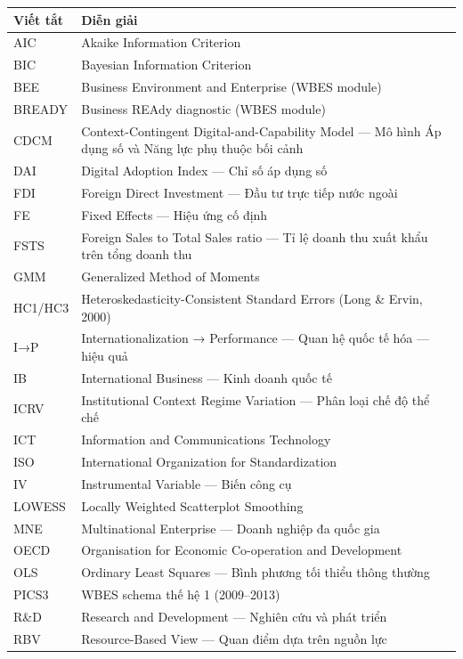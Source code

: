 \documentclass[12pt,a4paper]{article}
\begin{document}
\begin{longtable}[]{@{}ll@{}}
\toprule\noalign{}
Viết tắt & Diễn giải \\
\midrule\noalign{}
\endhead
\bottomrule\noalign{}
\endlastfoot
AIC & Akaike Information Criterion \\
BIC & Bayesian Information Criterion \\
BEE & Business Environment and Enterprise (WBES module) \\
BREADY & Business REAdy diagnostic (WBES module) \\
CDCM & Context-Contingent Digital-and-Capability Model --- Mô hình Áp
dụng số và Năng lực phụ thuộc bối cảnh \\
DAI & Digital Adoption Index --- Chỉ số áp dụng số \\
FDI & Foreign Direct Investment --- Đầu tư trực tiếp nước ngoài \\
FE & Fixed Effects --- Hiệu ứng cố định \\
FSTS & Foreign Sales to Total Sales ratio --- Tỉ lệ doanh thu xuất khẩu
trên tổng doanh thu \\
GMM & Generalized Method of Moments \\
HC1/HC3 & Heteroskedasticity-Consistent Standard Errors (Long \& Ervin,
2000) \\
I→P & Internationalization → Performance --- Quan hệ quốc tế hóa ---
hiệu quả \\
IB & International Business --- Kinh doanh quốc tế \\
ICRV & Institutional Context Regime Variation --- Phân loại chế độ thể
chế \\
ICT & Information and Communications Technology \\
ISO & International Organization for Standardization \\
IV & Instrumental Variable --- Biến công cụ \\
LOWESS & Locally Weighted Scatterplot Smoothing \\
MNE & Multinational Enterprise --- Doanh nghiệp đa quốc gia \\
OECD & Organisation for Economic Co-operation and Development \\
OLS & Ordinary Least Squares --- Bình phương tối thiểu thông thường \\
PICS3 & WBES schema thế hệ 1 (2009--2013) \\
R\&D & Research and Development --- Nghiên cứu và phát triển \\
RBV & Resource-Based View --- Quan điểm dựa trên nguồn lực \\

\end{longtable}
\end{document}
